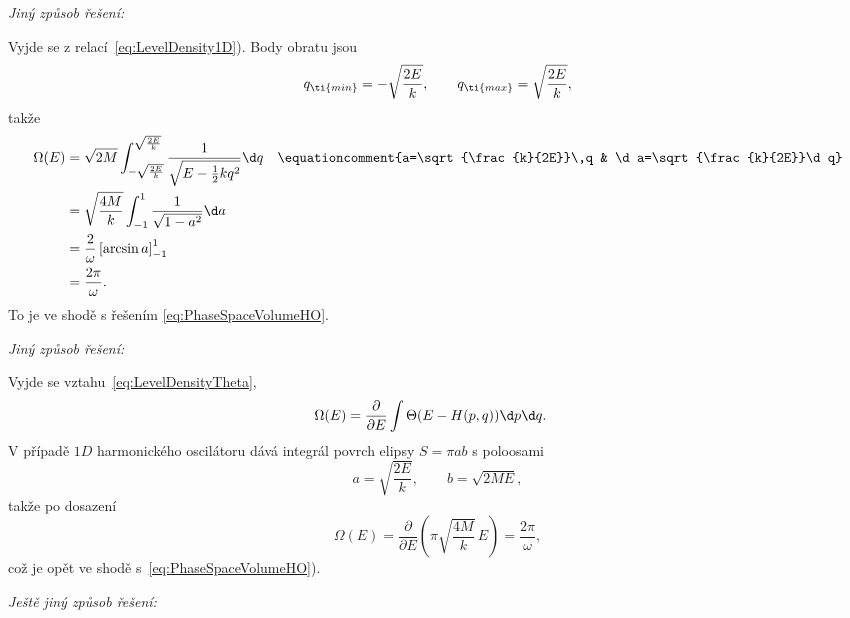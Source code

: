 \begin{solution}
    \begin{flushleft}
        \emph{Jiný způsob řešení:}
    \end{flushleft}
    
    Vyjde se z relací~\eqref{eq:LevelDensity1D}). 
    Body obratu jsou
    \begin{equation}
        q_{\ti{min}}
            =-\sqrt{\frac{2E}{k}},
            \qquad 
        q_{\ti{max}}
            =\sqrt{\frac{2E}{k}},
    \end{equation}
    takže
    \begin{align}
        \Omega(E)
            &=\sqrt{2M}\int_{-\sqrt{\frac{2E}{k}}}^{\sqrt{\frac{2E}{k}}}\frac{1}{\sqrt{E-\frac{1}{2}kq^{2}}}\d q
            &&\equationcomment{a=\sqrt{\frac{k}{2E}}\,q & \d a=\sqrt{\frac{k}{2E}}\d q}\nonumber\\
            &=\sqrt{\frac{4M}{k}}\int_{-1}^{1}\frac{1}{\sqrt{1-a^{2}}}\d a\nonumber\\
            &=\frac{2}{\omega}\left[\arcsin{a}\right]_{-1}^{1}\nonumber\\
            &=\frac{2\pi}{\omega}.
    \end{align}
    To je ve shodě s řešením \eqref{eq:PhaseSpaceVolumeHO}.
    
    \begin{flushleft}
        \emph{Jiný způsob řešení:} %
    \end{flushleft}
    
    Vyjde se vztahu~\eqref{eq:LevelDensityTheta},
    \begin{align}
        \Omega(E)
            &=\frac{\partial}{\partial E}\int\Theta(E-H(p,q))\d p\d q.
    \end{align}
    V případě $1D$ harmonického oscilátoru dává integrál povrch elipsy $S=\pi a b$ s poloosami 
    \begin{equation}
        a=\sqrt{\frac{2E}{k}},
        \qquad 
        b=\sqrt{2ME},
    \end{equation}
    takže po dosazení
    \begin{equation}
        \Omega(E)
            =\frac{\partial}{\partial E}\left(\pi\sqrt{\frac{4M}{k}}\,E\right)
            =\frac{2\pi}{\omega},
    \end{equation}
    což je opět ve shodě s~\eqref{eq:PhaseSpaceVolumeHO}).
    
    \begin{flushleft}
    \emph{Ještě jiný způsob řešení:} %
    \end{flushleft}
    

\end{solution}
